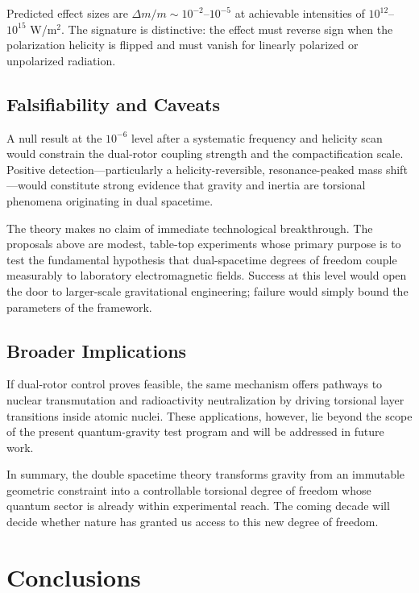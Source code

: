 \documentclass[dvipdfmx,11pt,a4paper]{article}
\begin{document}
Predicted effect sizes are $\Delta m / m \sim 10^{-2}$--$10^{-5}$ at achievable intensities of $10^{12}$--$10^{15}$ W/m$^2$. The signature is distinctive: the effect must reverse sign when the polarization helicity is flipped and must vanish for linearly polarized or unpolarized radiation.

\subsection{Falsifiability and Caveats}

A null result at the $10^{-6}$ level after a systematic frequency and helicity scan would constrain the dual-rotor coupling strength and the compactification scale. Positive detection—particularly a helicity-reversible, resonance-peaked mass shift—would constitute strong evidence that gravity and inertia are torsional phenomena originating in dual spacetime.

The theory makes no claim of immediate technological breakthrough. The proposals above are modest, table-top experiments whose primary purpose is to test the fundamental hypothesis that dual-spacetime degrees of freedom couple measurably to laboratory electromagnetic fields. Success at this level would open the door to larger-scale gravitational engineering; failure would simply bound the parameters of the framework.

\subsection{Broader Implications}

If dual-rotor control proves feasible, the same mechanism offers pathways to nuclear transmutation and radioactivity neutralization by driving torsional layer transitions inside atomic nuclei. These applications, however, lie beyond the scope of the present quantum-gravity test program and will be addressed in future work.

In summary, the double spacetime theory transforms gravity from an immutable geometric constraint into a controllable torsional degree of freedom whose quantum sector is already within experimental reach. The coming decade will decide whether nature has granted us access to this new degree of freedom.

\section{Conclusions}
\label{sec:conclusions}
\end{document}
